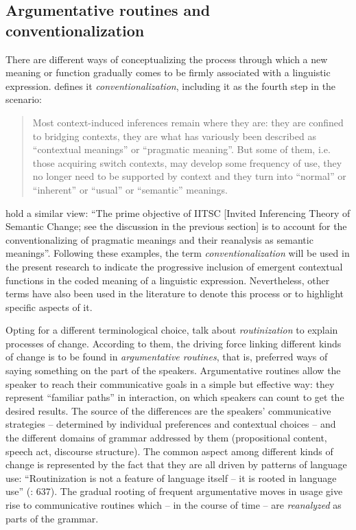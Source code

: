 \subsection{Argumentative routines and conventionalization}
\hypertarget{Toc124860636}{}
There are different ways of conceptualizing the process through which a new meaning or function gradually comes to be firmly associated with a linguistic expression. \citet{Heine2002} defines it \textit{conventionalization}, including it as the fourth step in the scenario:

\begin{quote}
Most context-induced inferences remain where they are: they are confined to bridging contexts, they are what has variously been described as “contextual meanings” or “pragmatic meaning”. But some of them, i.e. those acquiring switch contexts, may develop some frequency of use, they no longer need to be supported by context and they turn into “normal” or “inherent” or “usual” or “semantic” meanings. \citep[85]{Heine2002}
\end{quote}

\citet[35]{TraugottDasher2002} hold a similar view: “The prime objective of IITSC [Invited Inferencing Theory of Semantic Change; see the discussion in the previous section] is to account for the conventionalizing of pragmatic meanings and their reanalysis as semantic meanings”. Following these examples, the term \textit{conventionalization} will be used in the present research to indicate the progressive inclusion of emergent contextual functions in the coded meaning of a linguistic expression. Nevertheless, other terms have also been used in the literature to denote this process or to highlight specific aspects of it.

Opting for a different terminological choice, \citet{DetgesWaltereit2016} talk about \textit{routinization} to explain processes of change. According to them, the driving force linking different kinds of change is to be found in \textit{argumentative routines}, that is, preferred ways of saying something on the part of the speakers. Argumentative routines allow the speaker to reach their communicative goals in a simple but effective way: they represent “familiar paths” in interaction, on which speakers can count to get the desired results. The source of the differences are the speakers’ communicative strategies – determined by individual preferences and contextual choices – and the different domains of grammar addressed by them (propositional content, speech act, discourse structure). The common aspect among different kinds of change is represented by the fact that they are all driven by patterns of language use: “Routinization is not a feature of language itself – it is rooted in language use” (\citealt{DetgesWaltereit2016}: 637). The gradual rooting of frequent argumentative moves in usage give rise to communicative routines which – in the course of time – are \textit{reanalyzed} as parts of the grammar.

